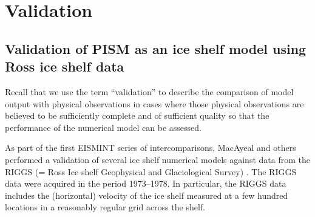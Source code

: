 \documentclass[11pt,final]{amsart}
\begin{document}

\clearpage\newpage
\section{Validation}\label{sect:valid}

\subsection{Validation of PISM as an ice shelf model using Ross ice shelf data} Recall that we use the term ``validation'' to describe the comparison of model output with physical observations in cases where those physical observations are believed to be sufficiently complete and of sufficient quality so that the performance of the numerical model can be assessed.

As part of the first EISMINT series of intercomparisons, MacAyeal and others \cite{MacAyealetal} performed a validation of several ice shelf numerical models against data from the RIGGS (= Ross Ice shelf Geophysical and Glaciological Survey) \cite{RIGGS1,RIGGS2}.  The RIGGS data were acquired in the period 1973--1978.   In particular, the RIGGS data includes the (horizontal) velocity of the ice shelf measured at a few hundred locations in a reasonably regular grid across the shelf.
\end{document}
